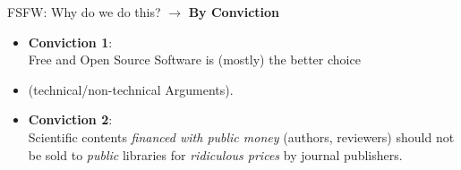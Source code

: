 \documentclass[t]{beamer}
\begin{document}

\begin{frame}[label=ct2]{\color{fg}FSFW: Why do we do this?}
 $\rightarrow$ \textbf{By  Conviction}\\[1cm]
  \begin{itemize}
  \item \textbf{Conviction 1}:\\
  Free and Open Source Software is (mostly) the better choice
  \item[] (technical/non-technical Arguments).
  \pause
  \bigskip
  \item \textbf{Conviction 2}:\\
  Scientific contents \textit{financed with public money}
  (authors, reviewers) should not be sold to \textit{public}
  libraries for \textit{ridiculous prices} by journal publishers.
  \end{itemize}
\end{frame}

\end{document}
